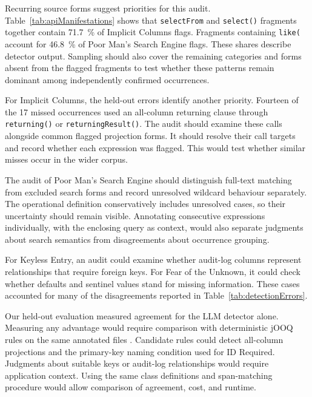 Recurring source forms suggest priorities for this audit. Table~\ref{tab:apiManifestations} shows that \texttt{selectFrom} and \texttt{select()} fragments together contain \qty{71.7}{\percent} of Implicit Columns flags. Fragments containing \texttt{like(} account for \qty{46.8}{\percent} of Poor Man's Search Engine flags. These shares describe detector output. Sampling should also cover the remaining categories and forms absent from the flagged fragments to test whether these patterns remain dominant among independently confirmed occurrences.

For Implicit Columns, the held-out errors identify another priority. Fourteen of the \num{17} missed occurrences used an all-column returning clause through \texttt{returning()} or \texttt{returningResult()}. The audit should examine these calls alongside common flagged projection forms. It should resolve their call targets and record whether each expression was flagged. This would test whether similar misses occur in the wider corpus.

The audit of Poor Man's Search Engine should distinguish full-text matching from excluded search forms and record unresolved wildcard behaviour separately. The operational definition conservatively includes unresolved cases, so their uncertainty should remain visible. Annotating consecutive expressions individually, with the enclosing query as context, would also separate judgments about search semantics from disagreements about occurrence grouping.

For Keyless Entry, an audit could examine whether audit-log columns represent relationships that require foreign keys. For Fear of the Unknown, it could check whether defaults and sentinel values stand for missing information. These cases accounted for many of the disagreements reported in Table~\ref{tab:detectionErrors}.

Our held-out evaluation measured agreement for the LLM detector alone. Measuring any advantage would require comparison with deterministic jOOQ rules on the same annotated files . Candidate rules could detect all-column projections and the primary-key naming condition used for ID Required. Judgments about suitable keys or audit-log relationships would require application context. Using the same class definitions and span-matching procedure would allow comparison of agreement, cost, and runtime.
